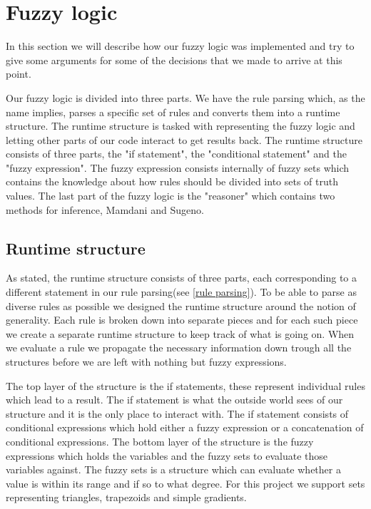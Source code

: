 \section{Fuzzy logic}\label{fuzzy logic}
In this section we will describe how our fuzzy logic was implemented and try to
give some arguments for some of the decisions that we made to arrive
at this point.

Our fuzzy logic is divided into three parts. We have the rule parsing which, as
the name implies, parses a specific set of rules and converts them into a runtime
structure. The runtime structure is tasked with representing the fuzzy logic and
letting other parts of our code interact to get results back. The runtime structure
consists of three parts, the "if statement", the "conditional statement" and
the "fuzzy expression". The fuzzy expression consists internally of fuzzy sets
which contains the knowledge about how rules should be divided into sets of truth
values. The last part of the fuzzy logic is the "reasoner" which contains two 
methods for inference, Mamdani and Sugeno.

\subsection{Runtime structure}\label{runtime structure}
As stated, the runtime structure consists of three parts, each corresponding to
a different statement in our rule parsing(see \ref{rule parsing}). To be able
to parse as diverse rules as possible we designed the runtime structure around
the notion of generality. Each rule is broken down into separate pieces and for
each such piece we create a separate runtime structure to keep track of what
is going on. When we evaluate a rule we propagate the necessary information
down trough all the structures before we are left with nothing but fuzzy expressions.

The top layer of the structure is the if statements, these represent individual
rules which lead to a result. The if statement is what the outside world sees
of our structure and it is the only place to interact with. The if statement
consists of conditional expressions which hold either a fuzzy expression or
a concatenation of conditional expressions. The bottom layer of the structure
is the fuzzy expressions which holds the variables and the fuzzy sets to evaluate
those variables against. The fuzzy sets is a structure which can evaluate whether
a value is within its range and if so to what degree. For this project
we support sets representing triangles, trapezoids and simple gradients.

